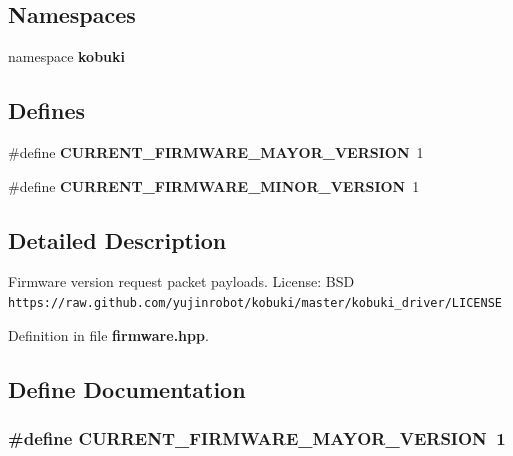\subsection*{\-Namespaces}
\begin{DoxyCompactItemize}
\item 
namespace {\bf kobuki}
\end{DoxyCompactItemize}
\subsection*{\-Defines}
\begin{DoxyCompactItemize}
\item 
\#define {\bf \-C\-U\-R\-R\-E\-N\-T\-\_\-\-F\-I\-R\-M\-W\-A\-R\-E\-\_\-\-M\-A\-Y\-O\-R\-\_\-\-V\-E\-R\-S\-I\-O\-N}~1
\item 
\#define {\bf \-C\-U\-R\-R\-E\-N\-T\-\_\-\-F\-I\-R\-M\-W\-A\-R\-E\-\_\-\-M\-I\-N\-O\-R\-\_\-\-V\-E\-R\-S\-I\-O\-N}~1
\end{DoxyCompactItemize}


\subsection{\-Detailed \-Description}
\-Firmware version request packet payloads. \-License\-: \-B\-S\-D {\tt https\-://raw.\-github.\-com/yujinrobot/kobuki/master/kobuki\-\_\-driver/\-L\-I\-C\-E\-N\-S\-E} 

\-Definition in file {\bf firmware.\-hpp}.



\subsection{\-Define \-Documentation}
\subsubsection[{\-C\-U\-R\-R\-E\-N\-T\-\_\-\-F\-I\-R\-M\-W\-A\-R\-E\-\_\-\-M\-A\-Y\-O\-R\-\_\-\-V\-E\-R\-S\-I\-O\-N}]{\setlength{\rightskip}{0pt plus 5cm}\#define {\bf \-C\-U\-R\-R\-E\-N\-T\-\_\-\-F\-I\-R\-M\-W\-A\-R\-E\-\_\-\-M\-A\-Y\-O\-R\-\_\-\-V\-E\-R\-S\-I\-O\-N}~1}\label{firmware_8hpp_a2652da927add240ca3d62a8078f76c87}


